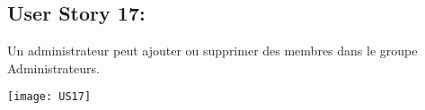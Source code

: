\newpage{}
\subsection{User Story 17:}
Un administrateur peut ajouter ou supprimer des membres dans le groupe Administrateurs.


  \begin{center}
        \texttt{[image: US17]}
  \end{center}